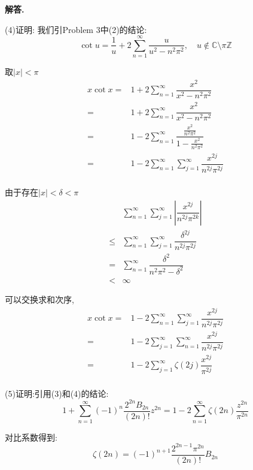 \documentclass[12pt, a4paper, oneside]{ctexart}
\newenvironment{solution}{\par\noindent\textbf{解答. }}{\par}
\begin{document}
\begin{solution}
\par
(4)证明:
我们引Problem 3中(2)的结论:
$$
\cot u=\dfrac{1}{u}+2\sum_{n=1}^{\infty}\dfrac{u}{u^2-n^2\pi^2}, \quad u \notin \mathbb{C} \setminus \pi \mathbb{Z}
$$
\par
取$|x|<\pi$
$$
\begin{aligned}
x\cot x=&1+2\sum_{n=1}^{\infty}\dfrac{x^2}{x^2-n^2\pi^2}\\
=&1+2\sum_{n=1}^{\infty}\dfrac{x^2}{x^2-n^2\pi^2}\\
=&1-2\sum_{n=1}^{\infty}\dfrac{\frac{x^2}{n^2\pi^2}}{1-\frac{x^2}{n^2\pi^2}}\\
=&1-2\sum_{n=1}^{\infty}\sum_{j=1}^{\infty}\dfrac{x^{2j}}{n^{2j}\pi^{2j}}\\
\end{aligned}
$$
\par
由于存在$|x|<\delta<\pi$
$$
\begin{aligned}
&\sum_{n=1}^{\infty}\sum_{j=1}^{\infty}\left|\dfrac{x^{2j}}{n^{2j}\pi^{2k}}\right|\\
\leqslant & \sum_{n=1}^{\infty}\sum_{j=1}^{\infty}\dfrac{\delta^{2j}}{n^{2j}\pi^{2j}}\\
=& \sum_{n=1}^{\infty}\dfrac{\delta^2}{n^2\pi^2-\delta^2}\\
<&\infty
\end{aligned}
$$
\par
可以交换求和次序,
$$
\begin{aligned}
x\cot x
=&1-2\sum_{n=1}^{\infty}\sum_{j=1}^{\infty}\dfrac{x^{2j}}{n^{2j}\pi^{2j}}\\
=&1-2\sum_{j=1}^{\infty}\sum_{n=1}^{\infty}\dfrac{x^{2j}}{n^{2j}\pi^{2j}}\\
=&1-2\sum_{j=1}^{\infty}\zeta(2j)\dfrac{x^{2j}}{\pi^{2j}}\\
\end{aligned}
$$
\par
(5)证明:引用(3)和(4)的结论:
$$
1+\sum_{n=1}^{\infty}(-1)^n\dfrac{2^{2n}B_{2n}}{(2n)!}z^{2n}=
1-2\sum_{n=1}^{\infty}\zeta(2n)\dfrac{z^{2n}}{\pi^{2n}}
$$
\par
对比系数得到:
$$
\zeta(2n)=(-1)^{n+1}\dfrac{2^{2n-1}\pi^{2n}}{(2n)!}B_{2n}
$$
\end{solution}
\end{document}
